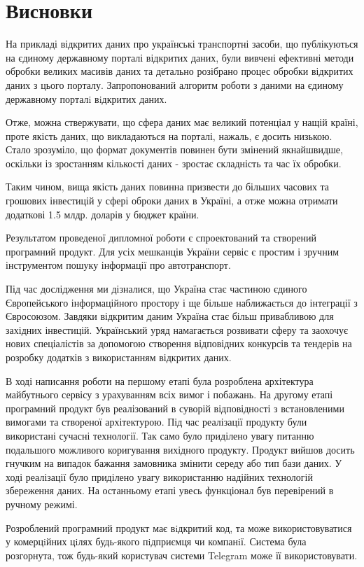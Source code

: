 \chapter*{Висновки}

На прикладі відкритих даних про українські транспортні засоби,
що публікуються на єдиному державному порталі відкритих даних, були
вивчені ефективні методи обробки великих масивів даних та
детально розібрано процес обробки відкритих даних з цього порталу.
Запропонований алгоритм роботи з даними на єдиному державному порталi вiдкритих даних.

Отже, можна ствержувати, що сфера даних має великий потенціал у нащій країні,
проте якість даних, що викладаються на порталі, нажаль, є досить низькою.
Стало зрозуміло, що формат документів повинен бути змінений якнайшвидше,
оскільки із зростанням кількості даних - зростає складність та час їх обробки.

Таким чином, вища якість даних повинна призвести до більших часових та грошових
інвестицій у сфері оброки даних в Україні,
а отже можна отримати додаткові 1.5 млдр. доларів у бюджет країни.

Результатом проведеної дипломної роботи є спроектований та створений програмний продукт.
Для усіх мешканців України сервіс є простим і зручним інструментом пошуку
інформації про автотранспорт.

Під час дослідження ми дізналися, що Україна стає частиною єдиного Європейського інформаційного простору
і ще більше наближається до інтеграції з Євросоюзом.
Завдяки відкритим даним Україна стає більш привабливою для західних інвестицій.
Український уряд намагається розвивати сферу та заохочує нових спеціалістів за допомогою створення відповідних конкурсів та
тендерів на розробку додатків з використанням відкритих даних.

В ході написання роботи на першому етапі була розроблена архітектура
майбутнього сервісу з урахуванням всіх вимог і побажань.
На другому етапі програмний продукт був реалізований в суворій відповідності з
встановленими вимогами та створеної архітектурою.
Під час реалізації продукту були використані сучасні технології.
Так само було приділено увагу питанню подальшого
можливого коригування вихідного продукту. Продукт вийшов
досить гнучким на випадок бажання замовника змінити середу або
тип бази даних. У ході реалізації було приділено увагу
використанню надійних технологій збереження даних.
На останньому етапі увесь функціонал був перевірений в ручному режимі.

Розроблений програмний продукт має вiдкритий код, та може використовуватися у комерцiйних цiлях будь-якого пiдприємця чи компанiї.
Система була розгорнута, тож будь-який користувач системи Telegram може її використовувати.

